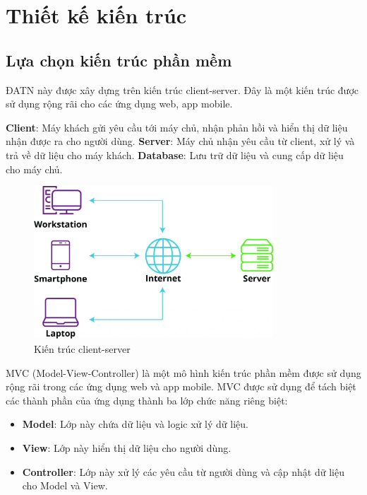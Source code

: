 \documentclass[../DoAn.tex]{subfiles}
\begin{document}
\section{Thiết kế kiến trúc}
\subsection{Lựa chọn kiến trúc phần mềm}
ĐATN này được xây dựng trên kiến trúc client-server. 
Đây là một kiến trúc được sử dụng rộng rãi cho các ứng dụng web, app mobile.

\textbf{Client}: Máy khách gửi yêu cầu tới máy chủ, nhận phản hồi và hiển thị 
dữ liệu nhận được ra cho người dùng.
\textbf{Server}: Máy chủ nhận yêu cầu từ client, xử lý và trả về dữ liệu cho máy khách.
\textbf{Database}: Lưu trữ dữ liệu và cung cấp dữ liệu cho máy chủ.
\begin{figure}[H]
    \centering
    \includegraphics[width=0.8\textwidth]{Hinhve/Kien-truc-client-server.png}
    \caption{Kiến trúc client-server}
    \label{fig:Kien-truc-client-server}
\end{figure}

MVC (Model-View-Controller) là một mô hình kiến trúc phần mềm được sử dụng 
rộng rãi trong các ứng dụng web và app mobile.
MVC được sử dụng để tách biệt các thành phần của ứng dụng thành ba lớp chức năng riêng biệt:
\begin{itemize}
  \item \textbf{Model}: Lớp này chứa dữ liệu và logic xử lý dữ liệu.
  \item \textbf{View}: Lớp này hiển thị dữ liệu cho người dùng.
  \item \textbf{Controller}: Lớp này xử lý các yêu cầu từ người dùng và cập nhật 
  dữ liệu cho Model và View.
\end{itemize}
\end{document}
